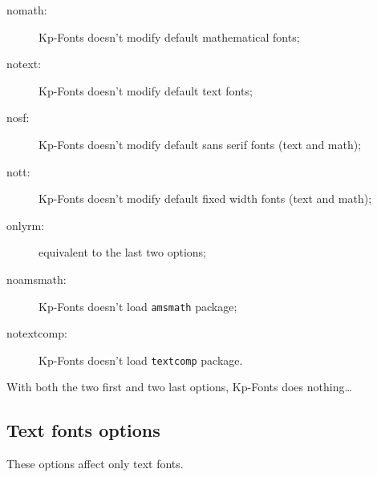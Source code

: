 \documentclass[a4paper,11pt]{christophe}
\begin{document}
\begin{description}
	\item[nomath:] Kp-Fonts doesn't modify default mathematical fonts;
	\item[notext:] Kp-Fonts doesn't modify default text fonts;
	\item[nosf:] Kp-Fonts doesn't modify default sans serif fonts (text and math);
	\item[nott:] Kp-Fonts doesn't modify default fixed width fonts (text and math);
	\item[onlyrm:] equivalent to the last two options;
	\item[noamsmath:] Kp-Fonts doesn't load \texttt{amsmath} package; 
	\item[notextcomp:] Kp-Fonts doesn't load \texttt{textcomp} package.
\end{description}

With both the two first and two last options, Kp-Fonts does nothing\dots


\subsection{Text fonts options}

These options affect only text fonts.
\end{document}

